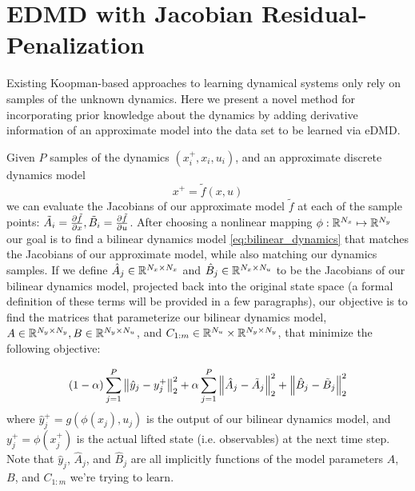 \documentclass{article}
\begin{document}
\section{EDMD with Jacobian Residual-Penalization} \label{sec:methodology}
Existing Koopman-based approaches to learning dynamical systems only rely on samples of
the unknown dynamics. Here we present a novel method for incorporating prior knowledge
about the dynamics by adding derivative information of an approximate model into the data
set to be learned via eDMD.

Given $P$ samples of the dynamics $(x_i^+, x_i, u_i)$, and an approximate discrete
dynamics model 
\begin{equation}
  x^+ = \tilde{f}(x,u)
\end{equation}
we can evaluate the Jacobians of our approximate model $\tilde{f}$ at each of the sample
points: $\tilde{A}_i = \pdv{\tilde{f}}{x}, \tilde{B}_i = \pdv{\tilde{f}}{u}$. After
choosing a nonlinear mapping $\phi : \mathbb{R}^{N_x} \mapsto \mathbb{R}^{N_y}$ our goal is to find a
bilinear dynamics model \eqref{eq:bilinear_dynamics} that matches the Jacobians of our
approximate model, while also matching our dynamics samples. If we define $\hat{A}_j \in
\mathbb{R}^{N_x \times N_x}$ and $\hat{B}_j \in \mathbb{R}^{N_x \times N_u}$ to be the Jacobians of our
bilinear dynamics model, projected back into the original state space (a formal definition
of these terms will be provided in a few paragraphs), our objective is to find the
matrices that parameterize our bilinear dynamics model, $A \in \mathbb{R}^{N_y \times N_y},B \in
\mathbb{R}^{N_y \times N_u}$, and $C_{1:m} \in \mathbb{R}^{N_u} \times \mathbb{R}^{N_y \times N_y}$, that minimize
the following objective:

\begin{equation} \label{eq:lls_objective}
  (1- \alpha) \sum_{j=1}^P \norm{\hat{y}_j - y_j^+}_2^2 + 
  \alpha  \sum_{j=1}^P \norm{\hat{A}_j - \tilde{A}_j}_2^2 + 
  \norm{\hat{B}_j - \tilde{B}_j}_2^2 
\end{equation}
where $\hat{y}_j^+ = g\left(\phi(x_j), u_j\right)$ is the output of our bilinear dynamics
model, and $y_j^+ = \phi(x_j^+)$ is the actual lifted state (i.e. observables) at the next
time step. Note that $\hat{y}_j$, $\hat{A}_j$, and $\hat{B}_j$ are all implicitly
functions of the model parameters $A$, $B$, and $C_{1:m}$ we're trying to learn.
\end{document}
